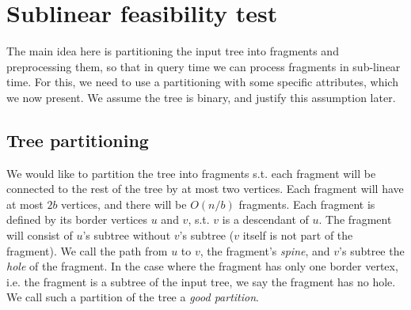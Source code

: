\documentclass[11pt,a4paper]{article}
\theoremstyle{definition}
\theoremstyle{remark}
\begin{document}
\section{Sublinear feasibility test}\label{sublinear f.t.}
The main idea here is partitioning the input tree into fragments and preprocessing them, so that in query time we can process fragments in sub-linear time. For this, we need to use a partitioning with some specific attributes, which we now present. We assume the tree is binary, and justify this assumption later.
\subsection{Tree partitioning}\label{tree partitioning}
We would like to partition the tree into fragments s.t. each fragment will be connected to the rest of the tree by at most two vertices. Each fragment will have at most $2b$ vertices, and there will be $O(n/b)$ fragments. Each fragment is defined by its border vertices $u$ and $v$, s.t. $v$ is a descendant of $u$. The fragment will consist of $u$'s subtree without $v$'s subtree ($v$ itself is not part of the fragment). We call the path from $u$ to $v$, the fragment's \textit{spine}, and $v$'s subtree the \textit{hole} of the fragment. In the case where the fragment has only one border vertex, i.e. the fragment is a subtree of the input tree, we say the fragment has no hole. We call such a partition of the tree a \emph{good partition}.
\end{document}
